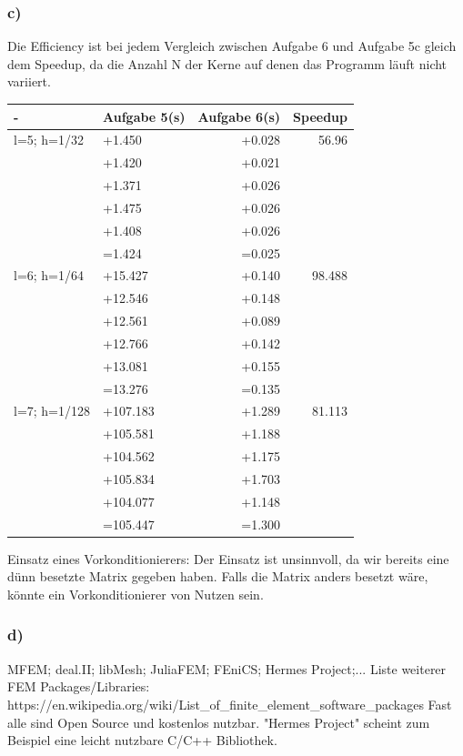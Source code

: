 \documentclass{article}
\begin{document}
	\subsubsection{c)}
Die Efficiency ist bei jedem Vergleich zwischen Aufgabe 6 und Aufgabe 5c gleich dem Speedup, da die Anzahl N der Kerne auf denen das Programm läuft nicht variiert.\newline
\begin{tabular}{|l|l|r|r|}
		\hline
		- & Aufgabe 5(s) & Aufgabe 6(s) & Speedup\\
		\hline
		l=5; h=1/32 &  +1.450 & +0.028 & 56.96 \\
		& +1.420 & +0.021 &    \\
		& +1.371 & +0.026 &    \\
		& +1.475 & +0.026 &    \\
		& +1.408 & +0.026 &   \\
		&=1.424 & =0.025  & \\
		\hline
		l=6; h=1/64 &  +15.427 & +0.140 & 98.488 \\
		& +12.546 & +0.148 &    \\
		& +12.561 & +0.089 &    \\
		& +12.766 & +0.142 &    \\
		& +13.081 & +0.155 &   \\
		&=13.276 & =0.135  & \\
		\hline
		l=7; h=1/128 &  +107.183 & +1.289 & 81.113 \\
		& +105.581 & +1.188 &    \\
		& +104.562 & +1.175 &    \\
		& +105.834 & +1.703 &    \\
		& +104.077 & +1.148 &   \\
		&=105.447 & =1.300  & \\
		\hline
	\end{tabular}
\newline
Einsatz eines Vorkonditionierers: Der Einsatz ist unsinnvoll, da wir bereits eine d\"{u}nn besetzte Matrix gegeben haben. Falls die Matrix anders besetzt wäre, könnte ein Vorkonditionierer von Nutzen sein.
	\subsubsection{d)}
MFEM; deal.II; libMesh; JuliaFEM; FEniCS; Hermes Project;...\newline
Liste weiterer FEM Packages/Libraries: https://en.wikipedia.org/wiki/List\_of\_finite\_element\_software\_packages \newline
Fast alle sind Open Source und kostenlos nutzbar. "Hermes Project" scheint zum Beispiel eine leicht nutzbare C/C++ Bibliothek.
\end{document}

